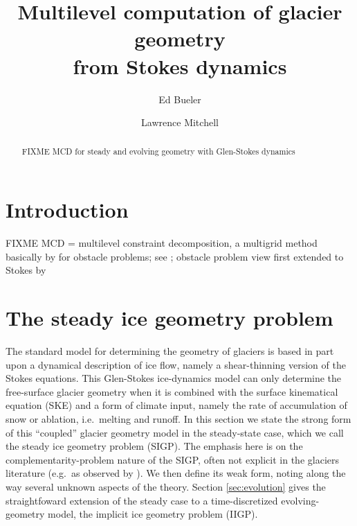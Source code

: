 \documentclass[letterpaper,final,12pt,reqno]{amsart}
\theoremstyle{claim}
\numberwithin{equation}{section}
\numberwithin{figure}{section}
\numberwithin{table}{section}
\numberwithin{theorem}{section}
\begin{document}
\title[Multilevel computation of glacier geometry from Stokes dynamics]{Multilevel computation of glacier geometry \\ from Stokes dynamics}

\author{Ed Bueler}

\author{Lawrence Mitchell}

\begin{abstract} FIXME MCD for steady and evolving geometry with Glen-Stokes dynamics
\end{abstract}

\maketitle


\thispagestyle{empty}

\section{Introduction} \label{sec:intro}

FIXME MCD = multilevel constraint decomposition, a multigrid \cite{Trottenbergetal2001} method basically by \cite{Tai2003} for obstacle problems; see \cite{Bueler2022};  obstacle problem view first extended to Stokes by \cite{WirbelJarosch2020}


\section{The steady ice geometry problem} \label{sec:stokesgeometry}

The standard model for determining the geometry of glaciers is based in part upon a dynamical description of ice flow, namely a shear-thinning version of the Stokes equations.  This Glen-Stokes ice-dynamics model can only determine the free-surface glacier geometry when it is combined with the surface kinematical equation (SKE) and a form of climate input, namely the rate of accumulation of snow or ablation, i.e.~melting and runoff.  In this section we state the strong form of this ``coupled'' glacier geometry model in the steady-state case, which we call the steady ice geometry problem (SIGP).  The emphasis here is on the complementarity-problem nature of the SIGP, often not explicit in the glaciers literature (e.g.~as observed by \cite{SchoofHewitt2013}).  We then define its weak form, noting along the way several unknown aspects of the theory.  Section \ref{sec:evolution} gives the straightfoward extension of the steady case to a time-discretized evolving-geometry model, the implicit ice geometry problem (IIGP).
\end{document}

